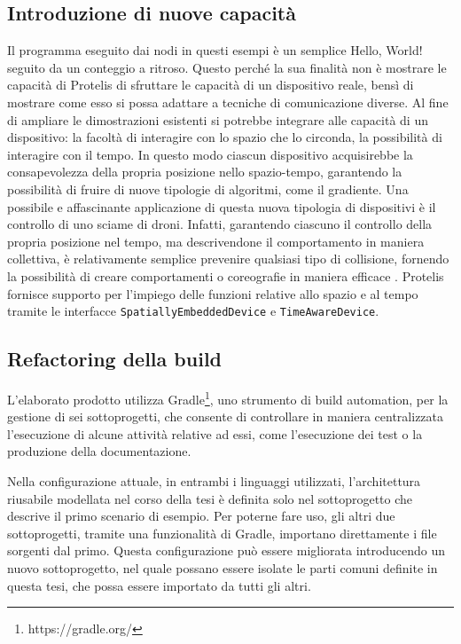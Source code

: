 \subsection{Introduzione di nuove capacità}
Il programma eseguito dai nodi in questi esempi è un semplice Hello, World!
seguito da un conteggio a ritroso. Questo perché la sua finalità non è mostrare
le capacità di Protelis di sfruttare le capacità di un dispositivo reale, bensì
di mostrare come esso si possa adattare a tecniche di comunicazione diverse.  Al
fine di ampliare le dimostrazioni esistenti si potrebbe integrare alle capacità
di un dispositivo: la facoltà di interagire con lo spazio che lo circonda, la
possibilità di interagire con il tempo. In questo modo ciascun dispositivo
acquisirebbe la consapevolezza della propria posizione nello spazio-tempo,
garantendo la possibilità di fruire di nuove tipologie di algoritmi, come il
gradiente. Una possibile e affascinante applicazione di questa nuova tipologia
di dispositivi è il controllo di uno sciame di droni. Infatti, garantendo
ciascuno il controllo della propria posizione nel tempo, ma descrivendone il
comportamento in maniera collettiva, è relativamente semplice prevenire
qualsiasi tipo di collisione, fornendo la possibilità di creare comportamenti o
coreografie in maniera efficace \cite{7789463}.  Protelis fornisce supporto per l'impiego delle
funzioni relative allo spazio e al tempo tramite le interfacce
\texttt{SpatiallyEmbeddedDevice} e \texttt{TimeAwareDevice}.

\subsection{Refactoring della build}
L'elaborato prodotto utilizza Gradle\footnote{https://gradle.org/}, uno
strumento di build automation, per la gestione di sei sottoprogetti, che
consente di controllare in maniera centralizzata l'esecuzione di alcune attività
relative ad essi, come l'esecuzione dei test o la produzione della documentazione.

Nella configurazione attuale, in entrambi i linguaggi utilizzati, l'architettura
riusabile modellata nel corso della tesi è definita solo nel sottoprogetto che
descrive il primo scenario di esempio. Per poterne fare uso, gli altri due
sottoprogetti, tramite una funzionalità di Gradle, importano direttamente i file
sorgenti dal primo. Questa configurazione può essere migliorata introducendo un
nuovo sottoprogetto, nel quale possano essere isolate le parti comuni definite
in questa tesi, che possa essere importato da tutti gli altri.


